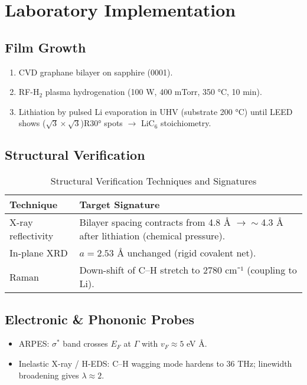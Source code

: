 \documentclass[11pt,a4paper]{article}
\begin{document}
\section{Laboratory Implementation}
\label{sec:lab_implementation}

\subsection{Film Growth}
\label{subsec:film_growth}
\begin{enumerate}
\item CVD graphane bilayer on sapphire (0001).
\item RF-H$_2$ plasma hydrogenation (100 W, 400 mTorr, 350 °C, 10 min).
\item Lithiation by pulsed Li evaporation in UHV (substrate 200 °C) until LEED shows ($\sqrt{3} \times \sqrt{3}$)R30° spots 
$\rightarrow$ LiC$_6$ stoichiometry.
\end{enumerate}

\subsection{Structural Verification}
\label{subsec:structural_verification}
\begin{table}[htbp]
\centering
\caption{Structural Verification Techniques and Signatures}
\label{tab:structural_verification}
\begin{tabularx}{\textwidth}{X X}
\toprule
\textbf{Technique} & \textbf{Target Signature} \\
\midrule
X-ray reflectivity & Bilayer spacing contracts from 4.8 Å 
$\rightarrow \sim$4.3 Å after lithiation (chemical pressure). \\
In-plane XRD & 
$a=2.53$ Å unchanged (rigid covalent net). \\
Raman & Down-shift of C–H stretch to 2780 cm⁻¹ (coupling to Li). \\
\bottomrule
\end{tabularx}
\end{table}

\subsection{Electronic \& Phononic Probes}
\label{subsec:electronic_phononic_probes}
\begin{itemize}
\item ARPES: 
$\sigma^*$ band crosses 
$E_F$ at 
$\Gamma$ with 
$v_F \approx 5$ eV Å.
\item Inelastic X-ray / H-EDS: C–H wagging mode hardens to 36 THz; linewidth broadening gives 
$\lambda \approx 2$.
\end{itemize}
\end{document}
